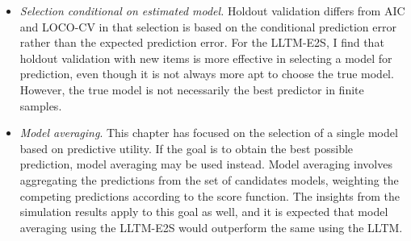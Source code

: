 \begin{itemize}
	\item \emph{Selection conditional on estimated model.} Holdout validation differs from AIC and LOCO-CV in that selection is based on the conditional prediction error rather than the expected prediction error. For the LLTM-E2S, I find that holdout validation with new items is more effective in selecting a model for prediction, even though it is not always more apt to choose the true model. However, the true model is not necessarily the best predictor in finite samples.
	\item \emph{Model averaging}. This chapter has focused on the selection of a single model based on predictive utility. If the goal is to obtain the best possible prediction, model averaging may be used instead. Model averaging involves aggregating the predictions from the set of candidates models, weighting the competing predictions according to the score function. The insights from the simulation results apply to this goal as well, and it is expected that model averaging using the LLTM-E2S would outperform the same using the LLTM.
\end{itemize}



\newpage


